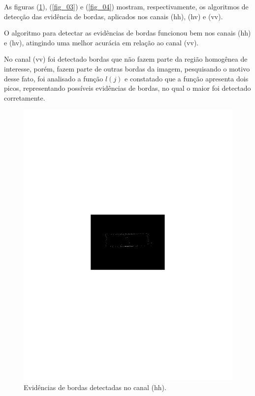 \documentclass[conference]{IEEEtran}
\begin{document}
As figuras (\ref{fig_02}), (\ref{fig_03}) e (\ref{fig_04}) mostram, respectivamente, os algoritmos de detecção das evidência de bordas, aplicados nos canais (hh), (hv) e (vv). 

O algoritmo para detectar as evidências de bordas funcionou bem nos canais (hh) e (hv), atingindo uma melhor acurácia em relação ao canal (vv).  

No canal (vv) foi detectado bordas que não fazem parte da região homogênea de interesse, porém, fazem parte de outras bordas da imagem, pesquisando o motivo desse fato, foi analisado a função $l(j)$ e constatado que a função apresenta dois picos, representando possíveis evidências de bordas, no qual o maior foi detectado corretamente. 
\begin{figure}[hbt]
	\includegraphics[scale=0.75]{flevoland_hh_evid_crop.pdf}
		\vspace{-6.0cm}
	\caption{Evidências de bordas detectadas no canal (hh).}
\label{fig_02}
\end{figure}
\end{document}
